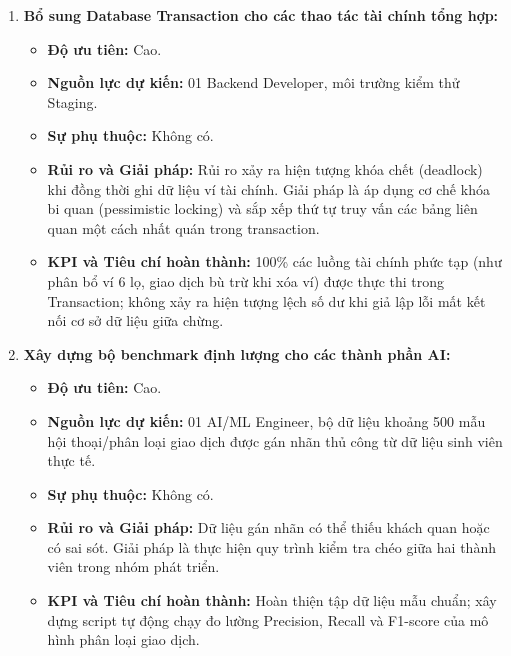 \begin{enumerate}
    \item \textbf{Bổ sung Database Transaction cho các thao tác tài chính tổng hợp:}
    \begin{itemize}
        \item \textbf{Độ ưu tiên:} Cao.
        \item \textbf{Nguồn lực dự kiến:} 01 Backend Developer, môi trường kiểm thử Staging.
        \item \textbf{Sự phụ thuộc:} Không có.
        \item \textbf{Rủi ro và Giải pháp:} Rủi ro xảy ra hiện tượng khóa chết (deadlock) khi đồng thời ghi dữ liệu ví tài chính. Giải pháp là áp dụng cơ chế khóa bi quan (pessimistic locking) và sắp xếp thứ tự truy vấn các bảng liên quan một cách nhất quán trong transaction.
        \item \textbf{KPI và Tiêu chí hoàn thành:} 100\% các luồng tài chính phức tạp (như phân bổ ví 6 lọ, giao dịch bù trừ khi xóa ví) được thực thi trong Transaction; không xảy ra hiện tượng lệch số dư khi giả lập lỗi mất kết nối cơ sở dữ liệu giữa chừng.
    \end{itemize}

    \item \textbf{Xây dựng bộ benchmark định lượng cho các thành phần AI:}
    \begin{itemize}
        \item \textbf{Độ ưu tiên:} Cao.
        \item \textbf{Nguồn lực dự kiến:} 01 AI/ML Engineer, bộ dữ liệu khoảng 500 mẫu hội thoại/phân loại giao dịch được gán nhãn thủ công từ dữ liệu sinh viên thực tế.
        \item \textbf{Sự phụ thuộc:} Không có.
        \item \textbf{Rủi ro và Giải pháp:} Dữ liệu gán nhãn có thể thiếu khách quan hoặc có sai sót. Giải pháp là thực hiện quy trình kiểm tra chéo giữa hai thành viên trong nhóm phát triển.
        \item \textbf{KPI và Tiêu chí hoàn thành:} Hoàn thiện tập dữ liệu mẫu chuẩn; xây dựng script tự động chạy đo lường Precision, Recall và F1-score của mô hình phân loại giao dịch.
    \end{itemize}


\end{enumerate}
